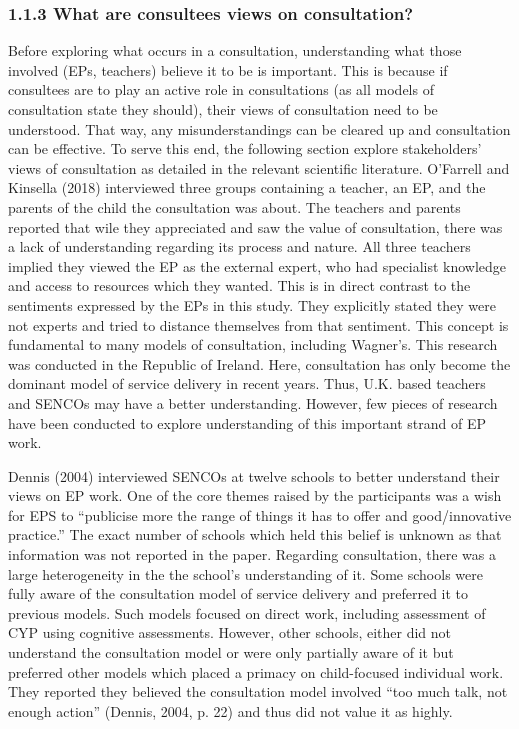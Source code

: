 \documentclass[
  english,
  man]{apa7}
\begin{document}
\hypertarget{what-are-consultees-views-on-consultation}{%
\subsubsection{1.1.3 What are consultees views on consultation?}\label{what-are-consultees-views-on-consultation}}

Before exploring what occurs in a consultation, understanding what those involved (EPs, teachers) believe it to be is important. This is because if consultees are to play an active role in consultations (as all models of consultation state they should), their views of consultation need to be understood. That way, any misunderstandings can be cleared up and consultation can be effective. To serve this end, the following section explore stakeholders' views of consultation as detailed in the relevant scientific literature. O'Farrell and Kinsella (2018) interviewed three groups containing a teacher, an EP, and the parents of the child the consultation was about. The teachers and parents reported that wile they appreciated and saw the value of consultation, there was a lack of understanding regarding its process and nature. All three teachers implied they viewed the EP as the external expert, who had specialist knowledge and access to resources which they wanted. This is in direct contrast to the sentiments expressed by the EPs in this study. They explicitly stated they were not experts and tried to distance themselves from that sentiment. This concept is fundamental to many models of consultation, including Wagner's. This research was conducted in the Republic of Ireland. Here, consultation has only become the dominant model of service delivery in recent years. Thus, U.K. based teachers and SENCOs may have a better understanding. However, few pieces of research have been conducted to explore understanding of this important strand of EP work.

Dennis (2004) interviewed SENCOs at twelve schools to better understand their views on EP work. One of the core themes raised by the participants was a wish for EPS to ``publicise more the range of things it has to offer and good/innovative practice.'' The exact number of schools which held this belief is unknown as that information was not reported in the paper. Regarding consultation, there was a large heterogeneity in the the school's understanding of it. Some schools were fully aware of the consultation model of service delivery and preferred it to previous models. Such models focused on direct work, including assessment of CYP using cognitive assessments. However, other schools, either did not understand the consultation model or were only partially aware of it but preferred other models which placed a primacy on child-focused individual work. They reported they believed the consultation model involved ``too much talk, not enough action'' (Dennis, 2004, p. 22) and thus did not value it as highly.
\end{document}
